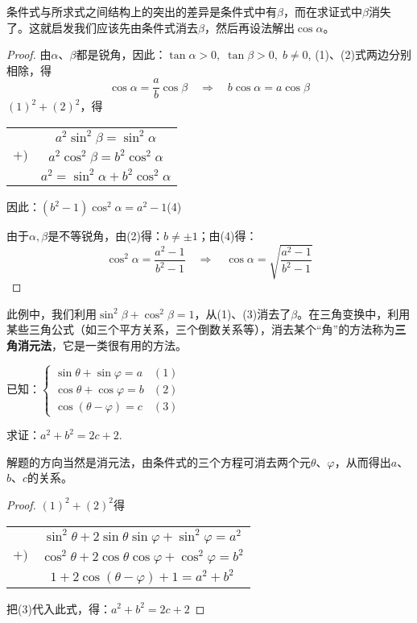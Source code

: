 \begin{analyze}
条件式与所求式之间结构上的突出的差异是条件式中有$\beta$，而在求证式中$\beta$消失了。这就启发我们应该先由条件式消去$\beta$，然后再设法解出$\cos\alpha$。
\end{analyze}

\begin{proof}
    由$\alpha$、$\beta$都是锐角，因此：$\tan\alpha>0,\; \tan\beta>0,\; b\ne 0$, (1)、(2)式两边分别相除，得
\begin{equation}
\cos\alpha=\frac{a}{b}\cos\beta \quad \Rightarrow\quad  b\cos\alpha=a\cos\beta \tag{3}
\end{equation}
$(1)^2+(2)^2$，得
\begin{center}
    \begin{tabular}{cc}
& $a^2\sin^2\beta=\sin^2\alpha$\\
$+)$& $a^2\cos^2\beta=b^2\cos^2\alpha$\\
\hline
&$a^2=\sin^2\alpha+b^2\cos^2\alpha$
    \end{tabular}
\end{center}
因此：$(b^2-1)\cos^2\alpha=a^2-1$\hfill(4)

由于$\alpha,\beta$是不等锐角，由(2)得：$b\ne \pm1$；由(4)得：
\[\cos^2\alpha=\frac{a^2-1}{b^2-1}\quad \Rightarrow\quad \cos\alpha=\sqrt{\frac{a^2-1}{b^2-1}}\]
\end{proof}

\begin{remark}
此例中，我们利用$\sin^2\beta+\cos^2\beta=1$，从(1)、(3)消去了$\beta$。在三角变换中，利用某些三角公式（如三个平方关系，三个倒数关系等），消去某个“角”的方法称为\textbf{三角消元法}，它是一类很有用的方法。
\end{remark}

\begin{example}
已知：$\begin{cases}
    \sin\theta+\sin\varphi=a& (1)\\
    \cos\theta+\cos\varphi=b& (2)\\
    \cos(\theta-\varphi)=c& (3)
\end{cases}$

求证：$a^2+b^2=2c+2$.
\end{example}

\begin{analyze}
解题的方向当然是消元法，由条件式的三个方程可消去两个元$\theta$、$\varphi$，从而得出$a$、$b$、$c$的关系。
\end{analyze}

\begin{proof}
$(1)^2+(2)^2$得
\begin{center}
\begin{tabular}{cc}
    & $\sin^2\theta+2\sin\theta\sin\varphi+\sin^2\varphi =a^2$\\
    $+)$ &$\cos^2\theta+2\cos\theta\cos\varphi+\cos^2\varphi=b^2$\\
    \hline
& $1+2\cos(\theta-\varphi)+1=a^2+b^2$
\end{tabular}
\end{center}
把(3)代入此式，得：$a^2+b^2=2c+2$
\end{proof}

